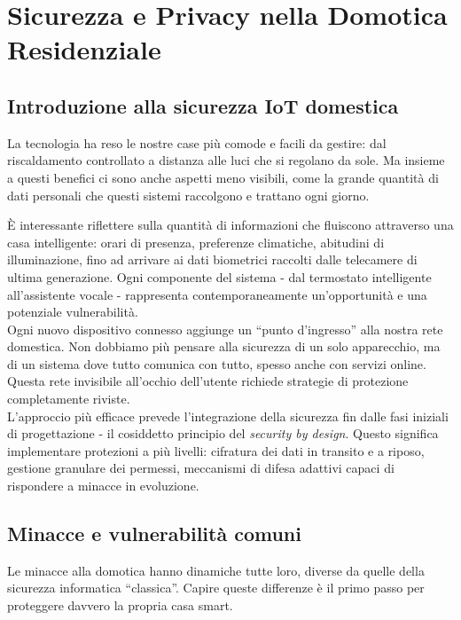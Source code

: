 \chapter{Sicurezza e Privacy nella Domotica Residenziale}

\section{Introduzione alla sicurezza IoT domestica}

La tecnologia ha reso le nostre case più comode e facili da gestire: dal riscaldamento controllato a distanza alle luci che si regolano da sole. Ma insieme a questi benefici ci sono anche aspetti meno visibili, come la grande quantità di dati personali che questi sistemi raccolgono e trattano ogni giorno.

È interessante riflettere sulla quantità di informazioni che fluiscono attraverso una casa intelligente: orari di presenza, preferenze climatiche, abitudini di illuminazione, fino ad arrivare ai dati biometrici raccolti dalle telecamere di ultima generazione. Ogni componente del sistema - dal termostato intelligente all'assistente vocale - rappresenta contemporaneamente un'opportunità e una potenziale vulnerabilità.\\

Ogni nuovo dispositivo connesso aggiunge un “punto d’ingresso” alla nostra rete domestica. Non dobbiamo più pensare alla sicurezza di un solo apparecchio, ma di un sistema dove tutto comunica con tutto, spesso anche con servizi online. Questa rete invisibile all’occhio dell’utente richiede strategie di protezione completamente riviste.\\

L'approccio più efficace prevede l'integrazione della sicurezza fin dalle fasi iniziali di progettazione - il cosiddetto principio del \textit{security by design}. Questo significa implementare protezioni a più livelli: cifratura dei dati in transito e a riposo, gestione granulare dei permessi, meccanismi di difesa adattivi capaci di rispondere a minacce in evoluzione.

\section{Minacce e vulnerabilità comuni}

Le minacce alla domotica hanno dinamiche tutte loro, diverse da quelle della sicurezza informatica “classica”. Capire queste differenze è il primo passo per proteggere davvero la propria casa smart.


